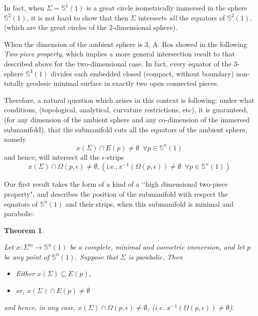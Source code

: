 \documentclass{amsart}
\newtheorem{theorem}{Theorem}[section]
\theoremstyle{definition}
\theoremstyle{remark}
\begin{document}
     In fact, when $\Sigma=\mathbb{S}^{1}(1)$ is a great circle isometrically immersed in the sphere $\mathbb{S}^{2}(1)$, it is not hard to show that then $\Sigma$ intersects {\em all} the equators of $ \mathbb{S}^{2}(1)$, (which are the great circles of the $2$-dimensional sphere).
     
     When the dimension of the ambient sphere is $3$, A. Ros showed in \cite{R} the following {\em Two-piece property}, which implies a more general intersection result to that described above for the two-dimensional case. In fact, every equator of the 3-sphere $\mathbb{S}^3(1)$ divides each embedded closed (compact, without boundary) non-totally geodesic minimal surface in exactly two open connected pieces.
     
    
  Therefore,  a natural question which arises in this context is following: under what conditions, (topological, analytical, curvature restrictions, etc), it is guaranteed, (for any dimension of the ambient sphere and any co-dimension of the immersed submanifold), that the submanifold cuts all the equators of the ambient sphere, namely
        $$x(\Sigma) \cap E(p) \neq \emptyset\,\,\,\forall p \in \mathbb{S}^n(1)$$ and hence, will intersect all the $\epsilon$-strips
        $$x(\Sigma) \cap \Omega(p,\epsilon) \neq \emptyset, (\text{i.e.}, x^{-1}(\Omega(p,\epsilon))\neq \emptyset\,\,\,\forall p \in \mathbb{S}^n(1))$$
   
    Our first result  takes the form of a kind of a \lq\lq high dimensional two-piece property", and describes the position of the submanifold with respect the equators of $\mathbb{S}^n(1)$ and their strips, when this submanifold is minimal and parabolic:
 
\begin{theorem}\label{twopiecegeneral}

Let $x:\Sigma^m \to \mathbb{S}^n(1)$ be a complete,  minimal and isometric immersion, and let $p$ be any point of $\mathbb{S}^n(1)$. Suppose that $\Sigma$ is parabolic. Then
    \begin{itemize}
        \item Either $x(\Sigma)\subseteq E(p)$, 
        \item or, $x(\Sigma)\cap E(p)\neq \emptyset$
            \end{itemize}
            and  hence, in any case,  $x(\Sigma) \cap \Omega(p,\epsilon) \neq \emptyset$, (i.e. $x^{-1}(\Omega(p,\epsilon))\neq \emptyset$).
\end{theorem}
\end{document}
